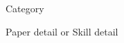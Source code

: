 


\begin{cvskills}


\cvskill
{\parbox[c][0.32cm][t]{1.75cm}{Category}} %
{Paper detail or Skill detail} %



\end{cvskills}